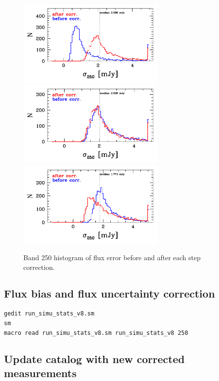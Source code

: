 \documentclass[11pt,a4paper]{article}
\begin{document}
\begin{figure}[H]
	\caption{
		Band 250 histogram of flux error before and after each step correction. 
	}
	\includegraphics[width=0.65\textwidth]{galsim_250_hist_uncertainty_1}
	\includegraphics[width=0.65\textwidth]{galsim_250_hist_uncertainty_2}
	\includegraphics[width=0.65\textwidth]{galsim_250_hist_uncertainty_3}
\end{figure}


\subsection{Flux bias and flux uncertainty correction}
\label{Band250_dfcorr}

\begin{lstlisting}[language=bash]
gedit run_simu_stats_v8.sm
sm
macro read run_simu_stats_v8.sm run_simu_stats_v8 250
\end{lstlisting}


\subsection{Update catalog with new corrected measurements}
\end{document}
